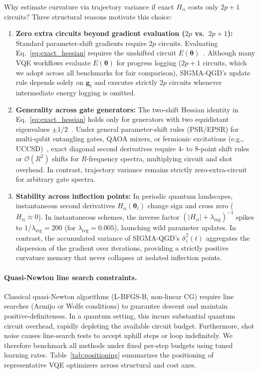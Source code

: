 \documentclass[sn-mathphys,Numbered]{sn-jnl}
\theoremstyle{thmstyleone}
\theoremstyle{thmstyletwo}
\theoremstyle{thmstylethree}
\begin{document}
Why estimate curvature via trajectory variance if exact $H_{ii}$ costs only $2p+1$ circuits? Three structural reasons motivate this choice:
\begin{enumerate}
    \item \textbf{Zero extra circuits beyond gradient evaluation ($2p$ vs.\ $2p+1$):} Standard parameter-shift gradients require $2p$ circuits. Evaluating Eq.~\eqref{eq:exact_hessian} requires the unshifted circuit $E(\boldsymbol{\theta})$~\cite{mari2021estimating,wierichs2022general}. Although many VQE workflows evaluate $E(\boldsymbol{\theta})$ for progress logging ($2p+1$ circuits, which we adopt across all benchmarks for fair comparison), SIGMA-QGD's update rule depends solely on $\mathbf{g}_t$ and executes strictly $2p$ circuits whenever intermediate energy logging is omitted.
    \item \textbf{Generality across gate generators:} The two-shift Hessian identity in Eq.~\eqref{eq:exact_hessian} holds only for generators with two equidistant eigenvalues $\pm 1/2$~\cite{mari2021estimating}. Under general parameter-shift rules (PSR/EPSR) for multi-qubit entangling gates, QAOA mixers, or fermionic excitations (e.g., UCCSD)~\cite{wierichs2022general}, exact diagonal second derivatives require $4$- to $8$-point shift rules or $\mathcal{O}(R^2)$ shifts for $R$-frequency spectra, multiplying circuit and shot overhead. In contrast, trajectory variance remains strictly zero-extra-circuit for arbitrary gate spectra.
    \item \textbf{Stability across inflection points:} In periodic quantum landscapes, instantaneous second derivatives $H_{ii}(\boldsymbol{\theta}_t)$ change sign and cross zero ($H_{ii} \approx 0$). In instantaneous schemes, the inverse factor $(|H_{ii}| + \lambda_{\text{reg}})^{-1}$ spikes to $1/\lambda_{\text{reg}} = 200$ (for $\lambda_{\text{reg}} = 0.005$), launching wild parameter updates. In contrast, the accumulated variance of SIGMA-QGD's $\hat{\sigma}_i^2(t)$ aggregates the dispersion of the gradient over iterations, providing a strictly positive curvature memory that never collapses at isolated inflection points.
\end{enumerate}

\paragraph{Quasi-Newton line search constraints.}
Classical quasi-Newton algorithms (L-BFGS-B, non-linear CG) require line searches (Armijo or Wolfe conditions) to guarantee descent and maintain positive-definiteness. In a quantum setting, this incurs substantial quantum circuit overhead, rapidly depleting the available circuit budget. Furthermore, shot noise causes line-search tests to accept uphill steps or loop indefinitely. We therefore benchmark all methods under fixed per-step budgets using tuned learning rates. Table~\ref{tab:positioning} summarizes the positioning of representative VQE optimizers across structural and cost axes.
\end{document}
